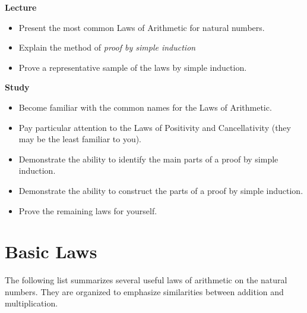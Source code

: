\begin{goals}
\noindent\textbf{Lecture}
\begin{itemize}
\item Present the most common Laws of Arithmetic for natural numbers.
\item Explain the method of \emph{proof by simple induction}
\item Prove a representative sample of the laws by simple induction.
\end{itemize}
\noindent\textbf{Study}
\begin{itemize}
\item Become familiar with the common names for the Laws of Arithmetic.
\item Pay particular attention to the Laws of Positivity and Cancellativity (they may be the least familiar to you).
\item Demonstrate the ability to identify the main parts of a proof by simple induction.
\item Demonstrate the ability to construct the parts of a proof by simple induction.
\item Prove the remaining laws for yourself.
\end{itemize}
\end{goals}

\ipadbreak

\section{Basic Laws}

The following list summarizes several useful laws of
arithmetic on the natural numbers. They are organized to emphasize
similarities between addition and multiplication.

